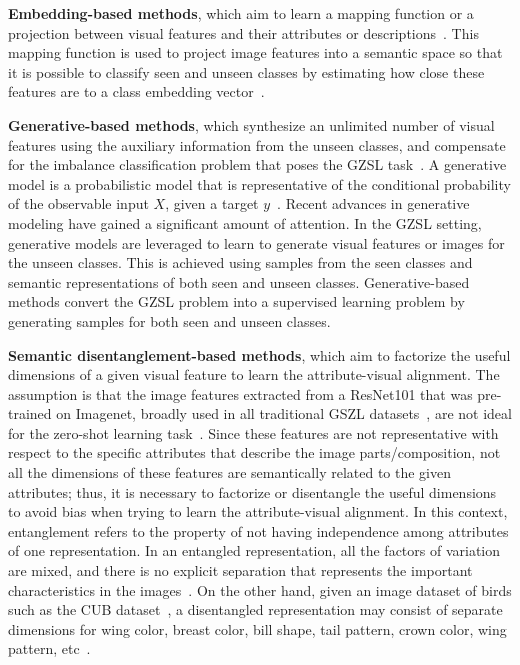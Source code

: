 \vspace{0.05in}
\textbf{Embedding-based methods}, which aim to learn a mapping function or a projection between visual features and their attributes or descriptions~\cite{DeViSE, ESZSL, ALE}. This mapping function is used to project image features into a semantic space so that it is possible to classify seen and unseen classes by estimating how close these features are to a class embedding vector~\cite{Rahman2018AUA, Chen2018ZeroShotVR, Shen2020InvertibleZR, 9724125}.

\vspace{0.05in}
\textbf{Generative-based methods}, which synthesize an unlimited number of visual features using the auxiliary information from the unseen classes, and compensate for the imbalance classification problem that poses the GZSL task~\cite{CADA_VAE, tfvaegan, CE}. A generative model is a probabilistic model that is representative of the conditional probability of the observable input $X$, given a target $y$~\cite{VAEs, GANs}. Recent advances in generative modeling have gained a significant amount of attention. In the GZSL setting, generative models are leveraged to learn to generate visual features or images for the unseen classes\cite{Su_2022_CVPR, Kong_2022_CVPR}. This is achieved using samples from the seen classes and semantic representations of both seen and unseen classes. Generative-based methods convert the GZSL problem into a supervised learning problem by generating samples for both seen and unseen classes.

\vspace{0.05in}
\textbf{Semantic disentanglement-based methods}, which aim to factorize the useful dimensions of a given visual feature to learn the attribute-visual alignment. The assumption is that the image features extracted from a ResNet101 that was pre-trained on Imagenet, broadly used in all traditional GSZL datasets~\cite{CUB, SUN, AWA2}, are not ideal for the zero-shot learning task~\cite{Tong2019HierarchicalDO, Chen2021FREE, SDGZSL}. Since these features are not representative with respect to the specific attributes that describe the image parts/composition, not all the dimensions of these features are semantically related to the given attributes; thus, it is necessary to factorize or disentangle the useful dimensions to avoid bias when trying to learn the attribute-visual alignment.
In this context, entanglement refers to the property of not having independence among attributes of one representation. In an entangled representation, all the factors of variation are mixed, and there is no explicit separation that represents the important characteristics in the images~\cite{Bengio2013RepresentationLA}. On the other hand, given an image dataset of birds such as the CUB dataset~\cite{CUB}, a disentangled representation may consist of separate dimensions for wing color, breast color, bill shape, tail pattern, crown color, wing pattern, etc~\cite{Eastwood2018AFF}.



